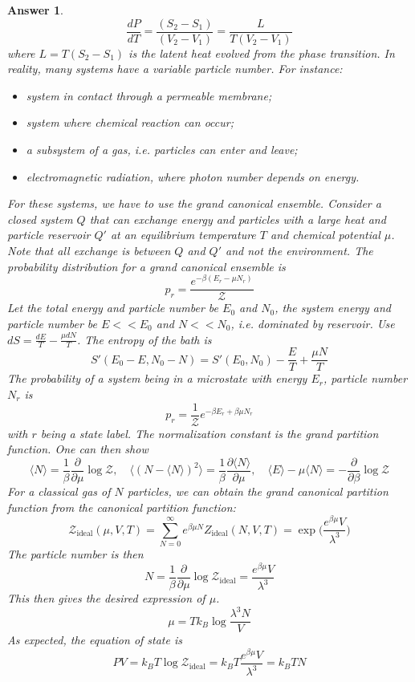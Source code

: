 \documentclass[a4paper]{article}
\newtheorem{ans}{Answer}[section]
\theoremstyle{new}
\begin{document}
\begin{ans}
$$\frac{dP}{dT}=\frac{(S_2-S_1)}{(V_2-V_1)}=\frac{L}{T(V_2-V_1)}$$
where $L=T(S_2-S_1)$ is the latent heat evolved from the phase transition. In reality, many systems have a variable particle number. For instance:
\begin{itemize}
    \item system in contact through a permeable membrane;
    \item system where chemical reaction can occur;
    \item a subsystem of a gas, i.e. particles can enter and leave;
    \item electromagnetic radiation, where photon number depends on energy.
\end{itemize}
For these systems, we have to use the grand canonical ensemble. Consider a closed system $Q$ that can exchange energy and particles with a large heat and particle reservoir $Q'$ at an equilibrium temperature $T$ and chemical potential $\mu$. Note that all exchange is between $Q$ and $Q'$ and not the environment. The probability distribution for a grand canonical ensemble is
$$p_r=\frac{e^{-\beta(E_r-\mu N_r)}}{\mathcal{Z}}$$
Let the total energy and particle number be $E_0$ and $N_0$, the system energy and particle number be $E<<E_0$ and $N<<N_0$, i.e. dominated by reservoir. Use $dS=\frac{dE}{T}-\frac{\mu dN}{T}$. The entropy of the bath is 
$$S'(E_0-E,N_0-N)=S'(E_0,N_0)-\frac{E}{T}+\frac{\mu N}{T}$$
The probability of a system being in a microstate with energy $E_r$, particle number $N_r$ is
$$p_r=\frac{1}{\mathcal{Z}}e^{-\beta E_r+\beta\mu N_r}$$
with $r$ being a state label. The normalization constant is the grand partition function. One can then show
$$\langle N\rangle=\frac{1}{\beta}\frac{\partial}{\partial\mu}\log\mathcal{Z},\quad\langle (N-\langle N\rangle)^2\rangle=\frac{1}{\beta}\frac{\partial\langle N\rangle}{\partial\mu},\quad\langle E\rangle-\mu\langle N\rangle=-\frac{\partial}{\partial\beta}\log\mathcal{Z}$$
For a classical gas of $N$ particles, we can obtain the grand canonical partition function from the canonical partition function:
$$\mathcal{Z}_{\text{ideal}}(\mu,V,T)=\sum_{N=0}^\infty e^{\beta\mu N}Z_{\text{ideal}}(N,V,T)=\exp\bigg(\frac{e^{\beta\mu }V}{\lambda^3}\bigg)$$
The particle number is then
$$N=\frac{1}{\beta}\frac{\partial}{\partial\mu}\log\mathcal{Z}_{\text{ideal}}=\frac{e^{\beta\mu }V}{\lambda^3}$$
This then gives the desired expression of $\mu$. 
$$\mu=Tk_B\log\frac{\lambda^3N}{V}$$
As expected, the equation of state is
$$PV=k_BT\log\mathcal{Z}_{\text{ideal}}=k_BT\frac{e^{\beta\mu}V}{\lambda^3}=k_BTN$$

\end{ans}
\end{document}
